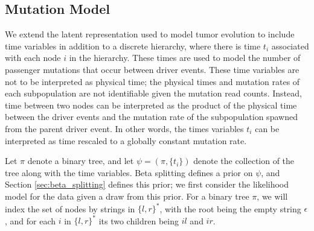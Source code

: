 \documentclass{bioinfo}
\newcommand{\Multinomial}{\mathrm{Multinomial}}
\begin{document}
\begin{methods}
\subsection{Mutation Model}

We extend the latent representation used to model tumor evolution to include time variables in addition to a discrete hierarchy, where there is time $t_i$ associated with each node $i$ in the hierarchy.  These times are used to model the number of passenger mutations that occur between driver events.  These time variables are not to be interpreted as physical time; the physical times and mutation rates of each subpopulation are not identifiable given the mutation read counts.  Instead, time between two nodes can be interpreted as the product of the physical time between the driver events and the mutation rate of the subpopulation spawned from the parent driver event.  In other words, the times variables $t_i$ can be interpreted as time rescaled to a globally constant mutation rate.

Let $\pi$ denote a binary tree, and let $\psi = (\pi, \{t_i\})$ denote the collection of the tree along with the time variables.  Beta splitting defines a prior on $\psi$, and  Section \ref{sec:beta_splitting} defines this prior; we first consider the likelihood model for the data given a draw from this prior.  For a binary tree $\pi$, we will index the set of nodes by strings in $\{l,r\}^*$, with the root being the empty string $\epsilon$, and for each $i$ in $\{l,r\}^*$ its two children being $il$ and $ir$.  

%
%
%
%
%


\end{methods}
\end{document}
